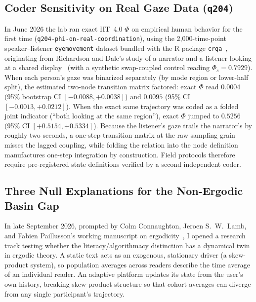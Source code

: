\documentclass[11pt,a4paper]{article}
\begin{document}
\subsection{Coder Sensitivity on Real Gaze Data (\texttt{q204})}

In June 2026 the lab ran exact IIT~4.0 $\Phi$ on empirical human behavior for the first time (\texttt{q204-phi-on-real-coordination}), using the 2,000-time-point speaker--listener \texttt{eyemovement} dataset bundled with the R package \texttt{crqa}~\cite{coco2014crqa}, originating from Richardson and Dale's study of a narrator and a listener looking at a shared display~\cite{richardson2005looking} (with a synthetic swap-coupled control reading $\Phi_s = 0.7929$). When each person's gaze was binarized separately (by mode region or lower-half split), the estimated two-node transition matrix factored: exact $\Phi$ read $0.0004$ (95\% bootstrap CI $[-0.0088, +0.0038]$) and $0.0095$ (95\% CI $[-0.0013, +0.0212]$). When the exact same trajectory was coded as a folded joint indicator (``both looking at the same region''), exact $\Phi$ jumped to $0.5256$ (95\% CI $[+0.5154, +0.5334]$). Because the listener's gaze trails the narrator's by roughly two seconds, a one-step transition matrix at the raw sampling grain misses the lagged coupling, while folding the relation into the node definition manufactures one-step integration by construction. Field protocols therefore require pre-registered state definitions verified by a second independent coder.

\subsection{Three Null Explanations for the Non-Ergodic Basin Gap}

In late September 2026, prompted by Colm Connaughton, Jeroen S.~W.~Lamb, and Fabien Paillusson's working manuscript on ergodicity~\cite{connaughton2026ergodicity}, I opened a research track testing whether the literacy/algorithmacy distinction has a dynamical twin in ergodic theory. A static text acts as an exogenous, stationary driver (a skew-product system), so population averages across readers describe the time average of an individual reader. An adaptive platform updates its state from the user's own history, breaking skew-product structure so that cohort averages can diverge from any single participant's trajectory.
\end{document}
